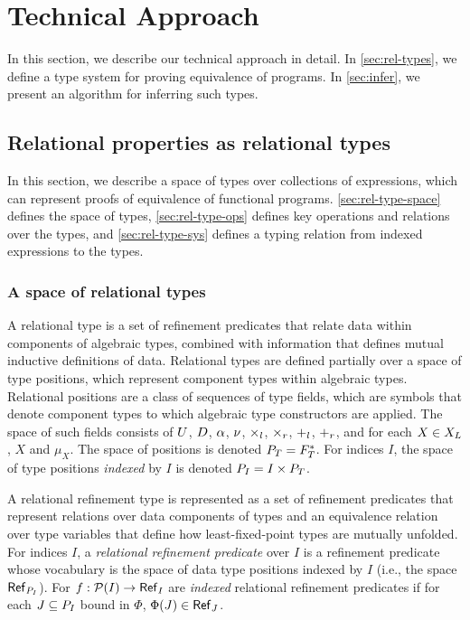 \section{Technical Approach}
%
In this section, we describe our technical approach in detail.
%
In \autoref{sec:rel-types}, we define a type system for proving
equivalence of programs.
%
In \autoref{sec:infer}, we present an algorithm for
inferring such types.

\subsection{Relational properties as relational types}
\label{sec:rel-types}
%
In this section, we describe a space of types over collections of
expressions, which can represent proofs of equivalence of functional
programs.
%
\autoref{sec:rel-type-space} defines the space of types, %
\autoref{sec:rel-type-ops} defines key operations and relations over
the types, and %
\autoref{sec:rel-type-sys} defines a typing relation from indexed
expressions to the types.

\subsubsection{A space of relational types}
\label{sec:rel-type-space}
A relational type is a set of refinement predicates that relate data
within components of algebraic types, combined with information that
defines mutual inductive definitions of data.
%
Relational types are defined partially over a space of type positions,
which represent component types within algebraic types.
%
Relational positions are a class of sequences of type fields, which
are symbols that denote component types to which algebraic type
constructors are applied.
%
The space of such fields consists of $U$, $D$,
$\alpha$, $\nu$, $\times_l$, $\times_r$,
$+_l$, $+_r$, and for each $X \in X_L$, $X$ and
$\mu_X$.
%
The space of positions is denoted $P_T = F_T^{*}$.
For indices $I$, the space of type positions \emph{indexed} by $I$ is
denoted $P_{I} = I \times P_T$.

A relational refinement type is represented as a set of refinement
predicates that represent relations over data components of types and
an equivalence relation over type variables that define how
least-fixed-point types are mutually unfolded.
%
For indices $I$, a \emph{relational refinement predicate} over $I$ is
a refinement predicate whose vocabulary is the space of data type
positions indexed by $I$ (i.e., the space
$\mathsf{Ref}_{ P_{I} }$).
%
For $f : \mathcal{P}(I) \to \mathsf{Ref}_{ I }$ are \emph{indexed} relational
refinement predicates if for each $J \subseteq P_{I}$ bound in
$\Phi$, $\Phi(J) \in \mathsf{Ref}_{J}$.

